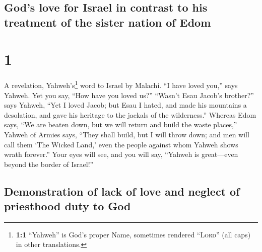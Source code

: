 \hypertarget{gods-love-for-israel-in-contrast-to-his-treatment-of-the-sister-nation-of-edom}{%
\subsection{God's love for Israel in contrast to his treatment of the
sister nation of
Edom}\label{gods-love-for-israel-in-contrast-to-his-treatment-of-the-sister-nation-of-edom}}

\hypertarget{section}{%
\section{1}\label{section}}

 A revelation, Yahweh's\footnote{\textbf{1:1} ``Yahweh''
  is God's proper Name, sometimes rendered ``\textsc{Lord}'' (all caps)
  in other translations.} word to Israel by Malachi.  ``I
have loved you,'' says Yahweh. Yet you say, ``How have you loved us?''
``Wasn't Esau Jacob's brother?'' says Yahweh, ``Yet I loved Jacob;
 but Esau I hated, and made his mountains a desolation,
and gave his heritage to the jackals of the wilderness.'' 
Whereas Edom says, ``We are beaten down, but we will return and build
the waste places,'' Yahweh of Armies says, ``They shall build, but I
will throw down; and men will call them `The Wicked Land,' even the
people against whom Yahweh shows wrath forever.''  Your
eyes will see, and you will say, ``Yahweh is great---even beyond the
border of Israel!''

\hypertarget{demonstration-of-lack-of-love-and-neglect-of-priesthood-duty-to-god}{%
\subsection{Demonstration of lack of love and neglect of priesthood duty
to
God}\label{demonstration-of-lack-of-love-and-neglect-of-priesthood-duty-to-god}}

